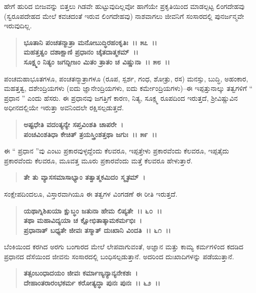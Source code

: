 ಹೇಗೆ ಹುರಿದ ಬೀಜವನ್ನು ಬಿತ್ತಲು ಗಿಡವೇ ಹುಟ್ಟುವುದಿಲ್ಲವೋ ಹಾಗೆಯೇ ಪ್ರಕೃತಿಯಿಂದ ಮಾಡಲ್ಪಟ್ಟ ಲಿಂಗದೇಹವು (ಸ್ವರೂಪದೇಹದ ಮೇಲೆ ಕವಚದಂತೆ ಇರುವ ಲಿಂಗದೇಹವು) ನಾಶವಾಗಲು ಜೀವನಿಗೆ ಸಂಸಾರದಲ್ಲಿ ಪುನರ್ಜನ್ಮವೇ ಇರುವುದಿಲ್ಲ.

\begin{verse}
\textbf{ಭೂತಾನಿ ಪಂಚತನ್ಮಾತ್ರಾ ಮನೋಬುದ್ಧಿರಹಂಕೃತಿಃ~।। ೫೭~।।}\\\textbf{ಮಹತ್ತತ್ವಂ ದಶಾಕ್ಷಾಣಿ ಪ್ರಧಾನಂ ಚೈತದಾತ್ಮಕಮ್~।। }\\\textbf{ಸೂಕ್ಷ್ಮಂ ನಿತ್ಯಂ ಜಗದ್ಬೀಜಂ ಮಿತಂ ತ್ರಾತಂ ಚ ವಿಷ್ಣುನಾ~।। ೫೮~।।}
\end{verse}

ಪಂಚಮಹಾಭೂತಗಳೂ, ಪಂಚತನ್ಮಾತ್ರಾಗಳೂ (ರೂಪ, ಸ್ಪರ್ಶ, ಗಂಧ, ಶೋತ್ರು, ರಸ) ಮನಸ್ಸು, ಬುದ್ಧಿ, ಅಹಂಕಾರ, ಮಹತ್ತತ್ವ, ದಶೇಂದ್ರಿಯಗಳು (ಐದು ಜ್ಞಾನೇಂದ್ರಿಯಗಳು, ಐದು ಕರ್ಮೇಂದ್ರಿಯಗಳು)–ಈ ಇಪ್ಪತ್ತುನಾಲ್ಕು ತತ್ವಗಳಿಗೆ “ ಪ್ರಧಾನ ” ಎಂದು ಹೆಸರು. ಈ ಪ್ರಧಾನವು ಜಗತ್ತಿಗೆ ಕಾರಣ, ನಿತ್ಯ, ಸೂಕ್ಷ್ಮ ರೂಪದಿಂದ ಇರುತ್ತದೆ, ಶ‍್ರೀವಿಷ್ಣುವಿನ ಅಧೀನದಲ್ಲಿಯೇ ಇರುತ್ತಾ ಅವನಿಂದಲೇ ರಕ್ಷಿಸಲ್ಪಡುತ್ತದೆ.

\begin{verse}
\textbf{ಅಷ್ಟಧೇತಿ ವದಂತ್ಯನ್ಯೇ ಸಪ್ತವಿಂಶತಿ ಚಾಪರೇ~।}\\\textbf{ಪಂಚವಿಂಶತಿಧಾ ಕೇಚಿತ್ ತ್ರಯಸ್ತ್ರಿಂಶತ್ತಥಾ ಜಗುಃ~।। ೫೯~।।}
\end{verse}

ಈ “ ಪ್ರಧಾನ ”ವು ಎಂಟು ಪ್ರಕಾರವುಳ್ಳದ್ದೆಂದು ಕೆಲವರೂ, ಇಪ್ಪತ್ತೇಳು ಪ್ರಕಾರವೆಂದು ಕೆಲವರೂ, ಇಪ್ಪತೈದು ಪ್ರಕಾರವೆಂದು ಕೆಲವರೂ, ಮೂವತ್ತ ಮೂರು ಪ್ರಕಾರವೆಂದು ಮತ್ತೆ ಕೆಲವರೂ ಹೇಳುತ್ತಾರೆ.

\begin{verse}
\textbf{ತೇ ತು ವ್ಯಾಸಸಮಾಸಾಭ್ಯಾಂ ತತ್ವಾತ್ಮಕಮಿದಂ ಸ್ಮೃತಮ್~।}
\end{verse}

ಸಂಕ್ಷೇಪದಿಂದಲೂ, ವಿಸ್ತಾರವಾಗಿಯೂ ಈ ತತ್ವಗಳ ವಿಂಗಡಣೆ ಈ ರೀತಿ ಇರುತ್ತದೆ.

\begin{verse}
\textbf{ಯಥಾಗ್ನಿಶಿಖಯಾ ಕ್ಷುಬ್ಧಂ ಜತುನಾ ಹೇಮ ಲಿಪ್ಯತೇ~।। ೬೦~।।}\\\textbf{ತಥಾ ಮಹಾವಿದ್ಯಯಾ ಚ ಕ್ಷೋಭಿತಾತ್ಕಾಮಕರ್ಮಭಿಃ~।}\\\textbf{ಪ್ರಧಾನಾತ್ ಬಧ್ಯತೇ ಜೀವಃ ತಸ್ಮಾತ್ ದುಃಖಾನಿ ವಿಂದತಿ~।। ೬೧~।।}
\end{verse}

ಬೆಂಕಿಯಿಂದ ಕರಗಿದ ಅರಗು ಬಂಗಾರದ ಮೇಲೆ ಲೇಪವಾಗುವಂತೆ, ಅಜ್ಞಾನ ಮತ್ತು ಕಾಮ್ಯ ಕರ್ಮಗಳಿಂದ ಕದಡಿದ ಪ್ರಧಾನದ ದೆಸೆಯಿಂದ ಜೀವನು ಸಂಸಾರದಲ್ಲಿ ಬಂಧಿಸಲ್ಪಡು\-ತ್ತಾನೆ. ಅದರಿಂದ ದುಃಖಾದಿಗಳನ್ನು ಪಡೆಯುತ್ತಾನೆ.

\begin{verse}
\textbf{ತತ್ಸಂಬಂಧಾದಯಂ ಜೀವಃ ಕರ್ಮಾಣ್ಯನ್ಯಾನ್ಯನೇಕಶಃ~।}\\\textbf{ದೇಹಾಂತರಾರಂಭಕರ್ಮ ಕರೋತ್ಯದ್ಧಾ ಪುನಃ ಪುನಃ~।। ೬೨~।।}
\end{verse}

